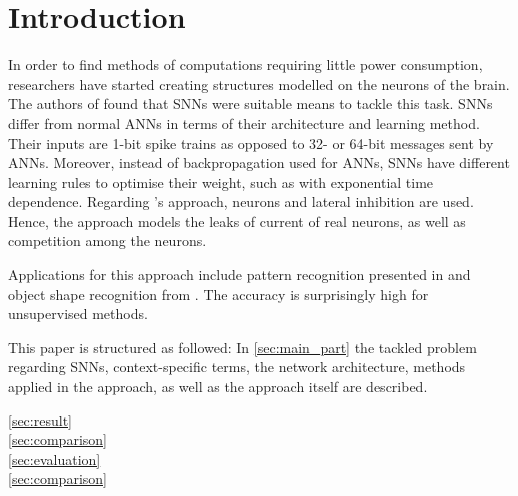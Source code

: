 \section{Introduction}

In order to find methods of computations requiring little power consumption, researchers have started creating structures modelled on the neurons of the brain.
The authors of \cite{SNN} found that \acp{SNN} were suitable means to tackle this task.
\acp{SNN} differ from normal \acp{ANN} in terms of their architecture and learning method.
Their inputs are 1-bit spike trains as opposed to 32- or 64-bit messages sent by \acp{ANN}.
Moreover, instead of backpropagation used for \acp{ANN}, \acp{SNN} have different learning rules to optimise their weight, such as  with exponential time dependence.
Regarding \cite{SNN}'s approach,  neurons and lateral inhibition are used.
Hence, the approach models the leaks of current of real neurons, as well as competition among the neurons.

Applications for this approach include pattern recognition presented in \cite{SNN} and object shape recognition from \cite{object_detection_SNN}.
The accuracy is surprisingly high for unsupervised methods.

This paper is structured as followed:
In \autoref{sec:main_part} the tackled problem regarding \acp{SNN}, context-specific terms, the network architecture, methods applied in the approach, as well as the approach itself are described.

\textcolor{red}{\autoref{sec:result}\\
\autoref{sec:comparison}\\
\autoref{sec:evaluation}\\
\autoref{sec:comparison}}